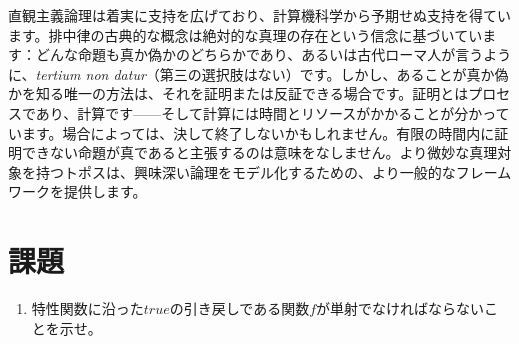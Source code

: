 直観主義論理は着実に支持を広げており、計算機科学から予期せぬ支持を得ています。排中律の古典的な概念は絶対的な真理の存在という信念に基づいています：どんな命題も真か偽かのどちらかであり、あるいは古代ローマ人が言うように、\emph{tertium non datur}（第三の選択肢はない）です。しかし、あることが真か偽かを知る唯一の方法は、それを証明または反証できる場合です。証明とはプロセスであり、計算です——そして計算には時間とリソースがかかることが分かっています。場合によっては、決して終了しないかもしれません。有限の時間内に証明できない命題が真であると主張するのは意味をなしません。より微妙な真理対象を持つトポスは、興味深い論理をモデル化するための、より一般的なフレームワークを提供します。

\section{課題}

\begin{enumerate}
  \tightlist
  \item
        特性関数に沿った$\mathit{true}$の引き戻しである関数$f$が単射でなければならないことを示せ。
\end{enumerate}
